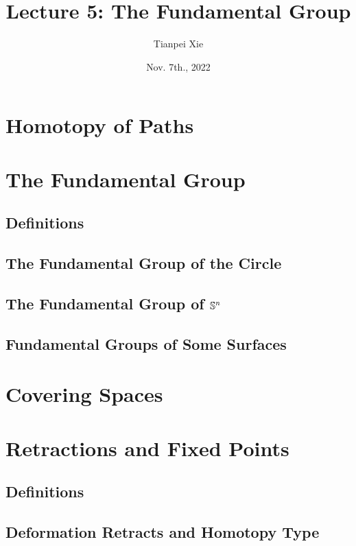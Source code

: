 \documentclass[11pt]{article}
\begin{document}
\title{Lecture 5: The Fundamental Group}
\author{ Tianpei Xie}
\date{Nov. 7th., 2022}
\maketitle
\tableofcontents
\newpage
\section{Homotopy of Paths}
\section{The Fundamental Group}
\subsection{Definitions}
\subsection{The Fundamental Group of the Circle}
\subsection{The Fundamental Group of ${\mathbb S}^n$}
\subsection{Fundamental Groups of Some Surfaces}

\section{Covering Spaces}
\section{Retractions and Fixed Points}
\subsection{Definitions}
\subsection{Deformation Retracts and Homotopy Type}
\newpage


\end{document}
